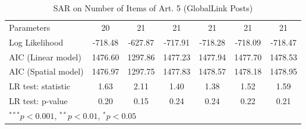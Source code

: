 \begin{table}[!h]
\begin{center}
\begin{tabular}{l c c c c c c }
Parameters              & 20           & 21           & 21           & 21           & 21           & 21           \\
Log Likelihood          & -718.48      & -627.87      & -717.91      & -718.28      & -718.09      & -718.47      \\
AIC (Linear model)      & 1476.60      & 1297.86      & 1477.23      & 1477.94      & 1477.70      & 1478.53      \\
AIC (Spatial model)     & 1476.97      & 1297.75      & 1477.83      & 1478.57      & 1478.18      & 1478.95      \\
LR test: statistic      & 1.63         & 2.11         & 1.40         & 1.38         & 1.52         & 1.59         \\
LR test: p-value        & 0.20         & 0.15         & 0.24         & 0.24         & 0.22         & 0.21         \\
\bottomrule
\multicolumn{7}{l}{\scriptsize{$^{***}p<0.001$, $^{**}p<0.01$, $^*p<0.05$}}
\end{tabular}
\caption{SAR on Number of Items of Art. 5 (GlobalLink Posts)}
\label{table:coefficients}
\end{center}
\end{table}

